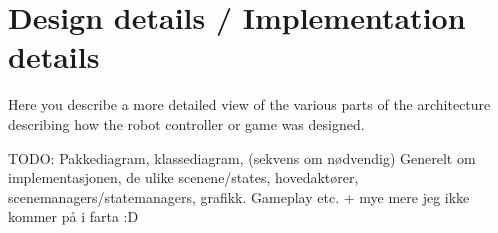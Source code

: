 \chapter{Design details / Implementation details}

Here you describe a more detailed view of the various parts of the 
architecture describing how the robot controller or game was designed.

TODO: Pakkediagram, klassediagram, (sekvens om nødvendig)
Generelt om implementasjonen, de ulike scenene/states, hovedaktører, scenemanagers/statemanagers, grafikk. Gameplay etc.  + mye mere jeg ikke kommer på i farta :D 